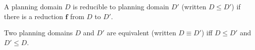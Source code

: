 \begin{definition}[Reducibility]
A planning domain $D$ is reducible to planning domain $D'$ (written $D\leq D'$)
if there is a reduction $\mathbf f$ from $D$ to $D'$.
\end{definition}

\begin{definition}
Two planning domains $D$ and $D'$ are equivalent (written $D\equiv D'$) iff
$D\leq D'$ and $D'\leq D$.
\end{definition}





